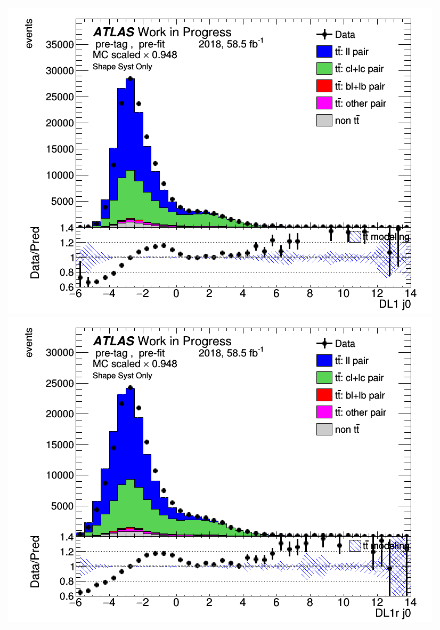 \documentclass[letterpaper,12pt]{article}
\begin{document}
	
\begin{figure}[H]
	\begin{minipage}[b]{.45\textwidth}
	\centering
	\includegraphics[width=1\textwidth]{Distribution_March_highpT/DataMC_J0_DL1.png}
	\end{minipage}\hfill
	\begin{minipage}[b]{.45\textwidth}
	\centering
	\includegraphics[width=1\textwidth]{Distribution_March_highpT/DataMC_J0_DL1r.png}
	\end{minipage}\hfill
	\begin{minipage}[b]{.45\textwidth}
	\centering

\end{minipage}
\end{figure}
\end{document}
